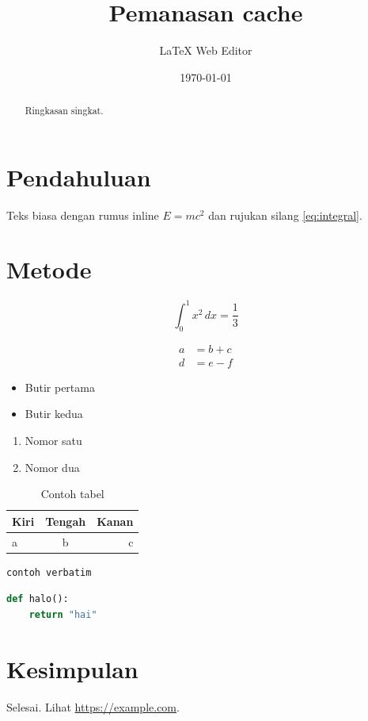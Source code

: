 \documentclass[11pt]{article}
\begin{document}
\title{Pemanasan cache}
\author{LaTeX Web Editor}
\date{\today}
\maketitle

\begin{abstract}
Ringkasan singkat.
\end{abstract}

\tableofcontents

\section{Pendahuluan}
Teks biasa dengan rumus inline $E = mc^2$ dan rujukan silang
\ref{eq:integral}.

\section{Metode}
\begin{equation}
  \int_0^1 x^2 \, dx = \frac{1}{3}
  \label{eq:integral}
\end{equation}

\begin{align}
  a &= b + c \\
  d &= e - f
\end{align}

\begin{itemize}
  \item Butir pertama
  \item Butir kedua
\end{itemize}

\begin{enumerate}
  \item Nomor satu
  \item Nomor dua
\end{enumerate}

\begin{table}[H]
  \centering
  \begin{tabular}{lcr}
    \toprule
    Kiri & Tengah & Kanan \\
    \midrule
    a & b & c \\
    \bottomrule
  \end{tabular}
  \caption{Contoh tabel}
\end{table}

\begin{verbatim}
contoh verbatim
\end{verbatim}

\begin{lstlisting}[language=Python]
def halo():
    return "hai"
\end{lstlisting}

\section{Kesimpulan}
Selesai. Lihat \url{https://example.com}.
\end{document}
